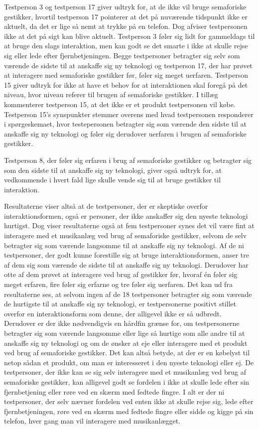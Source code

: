 Testperson 3 og testperson 17 giver udtryk for, at de ikke vil bruge semaforiske gestikker, hvortil testperson 17 pointerer at det på nuværende tidspunkt ikke er aktuelt, da det er lige så nemt at trykke på en telefon. Dog afviser testpersonen ikke at det på sigt kan blive aktuelt. Testperson 3 føler sig lidt for gammeldags til at bruge den slags interaktion, men kan godt se det smarte i ikke at skulle rejse sig eller lede efter fjernbetjeningen. Begge testpersoner betragter sig selv som værende de sidste til at anskaffe sig ny teknologi og testperson 17, der har prøvet at interagere med semaforiske gestikker før, føler sig meget uerfaren. Testperson 15 giver udtryk for ikke at have et behov for at interaktionen skal foregå på det niveau, hvor niveau referer til brugen af semaforiske gestikker. I tillæg kommenterer testperson 15, at det ikke er et produkt testpersonen vil købe. Testperson 15's synspunkter stemmer overens med hvad testpersonen responderer i spørgeskemaet, hvor testepersonen betragter sig som værende den sidste til at anskaffe sig ny teknologi og føler sig derudover uerfaren i brugen af semaforiske gestikker. 
 
 
 Testperson 8, der føler sig erfaren i brug af semaforiske gestikker og betragter sig som den sidste til at anskaffe sig ny teknologi, giver også udtryk for, at vedkommende i hvert fald lige skulle vende sig til at bruge gestikker til interaktion.

Resultaterne viser altså at de testpersoner, der er skeptiske overfor interaktionsformen, også er personer, der ikke anskaffer sig den nyeste teknologi hurtigst. Dog viser resultaterne også at fem testpersoner synes det vil være fint at interagere med et musikanlæg ved brug af semaforiske gestikker, selvom de selv betragter sig som værende langsomme til at anskaffe sig ny teknologi. Af de ni testpersoner, der godt kunne forestille sig at bruge interaktionsformen, anser tre af dem sig som værende de sidste til at anskaffe sig ny teknologi. Derudover har otte af dem prøvet at interagere ved brug af gestikker før, hvoraf én føler sig meget erfaren, fire føler sig erfarne og tre føler sig uerfaren. Det kan ud fra resultaterne ses, at selvom ingen af de 18 testpersoner betragter sig som værende de hurtigste til at anskaffe sig ny teknologi, er testpersonerne positivt stillet overfor en interaktionsform som denne, der alligevel ikke er så udbredt. Derudover er der ikke nødvendigvis en hårdfin grænse for, om testpersonerne betragter sig som værende langsomme eller lige så hurtige som alle andre til at anskaffe sig ny teknologi og om de ønsker at eje eller interagere med et produkt ved brug af semaforiske gestikker. Det kan altså betyde, at der er en købelyst til netop sådan et produkt, om man er interesseret i den nyeste teknologi eller ej. De testpersoner, der ikke kan se sig selv interagere med et musikanlæg ved brug af semaforiske gestikker, kan alligevel godt se fordelen i ikke at skulle lede efter sin fjernbetjening eller røre ved en skærm med fedtede fingre. I alt er der ni testpersoner, der selv nævner fordelen ved enten ikke at skulle rejse sig, lede efter fjernbetjeningen, røre ved en skærm med fedtede fingre eller sidde og kigge på sin telefon, hver gang man vil interagere med musikanlægget. \blankline
 
